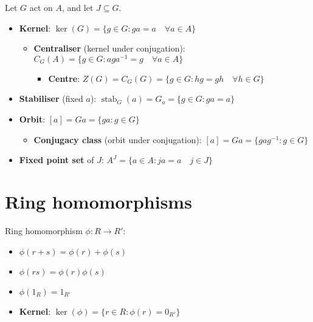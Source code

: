 Let $G$ act on $A$, and let $J \subseteq G$.
\begin{itemize}
    \item \textbf{Kernel}: $\ker(G) = \{ g \in G : ga = a \quad \forall a \in A \}$
        \begin{itemize}
            \item \textbf{Centraliser} (kernel under conjugation): $C_G(A) = \{ g \in G : aga^{-1} = g \quad \forall a \in A \}$
                \begin{itemize}
                    \item \textbf{Centre}: $Z(G) = C_G(G) = \{ g \in G : hg = gh \quad \forall h \in G \}$
                \end{itemize}
        \end{itemize}
    \item \textbf{Stabiliser} (fixed $a$): $\operatorname{stab}_G(a) = G_a = \{ g \in G : g a = a \}$
    \item \textbf{Orbit}: $[a] = Ga = \{ ga : g \in G \}$
        \begin{itemize}
            \item \textbf{Conjugacy class} (orbit under conjugation): $[a] = Ga = \{ gag^{-1} : g \in G \}$
        \end{itemize}
    \item \textbf{Fixed point set} of $J$: $A^J = \{ a \in A : ja = a \quad j \in J \}$
\end{itemize}

\section{Ring homomorphisms}

Ring homomorphism $\phi : R \to R'$:
    \begin{itemize}
        \item $\phi(r + s) = \phi(r) + \phi(s)$
        \item $\phi(rs) = \phi(r) \phi(s)$
        \item $\phi(1_R) = 1_{R'}$
    \end{itemize}

\begin{itemize}
    \item \textbf{Kernel}: $\ker(\phi) = \{r \in R : \phi(r) = 0_{R'}\}$
\end{itemize}

